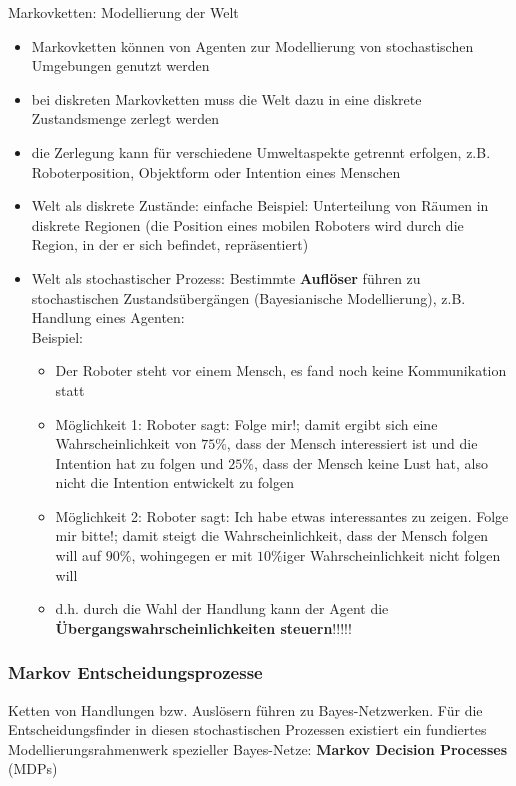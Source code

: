 Markovketten: Modellierung der Welt
\begin{itemize}
	\item Markovketten k\"onnen von Agenten zur Modellierung von stochastischen Umgebungen genutzt werden
	\item bei diskreten Markovketten muss die Welt dazu in eine diskrete Zustandsmenge zerlegt werden
	\item die Zerlegung kann f\"ur verschiedene Umweltaspekte getrennt erfolgen, z.B. Roboterposition, Objektform oder Intention eines Menschen
	\item Welt als diskrete Zust\"ande: einfache Beispiel: Unterteilung von R\"aumen in diskrete Regionen (die Position eines mobilen Roboters wird durch die Region, in der er sich befindet, repr\"asentiert)
	\item Welt als stochastischer Prozess: Bestimmte \textbf{Aufl\"oser} f\"uhren zu stochastischen Zustands\"uberg\"angen (Bayesianische Modellierung), z.B. Handlung eines Agenten:\\ Beispiel:
	\begin{itemize}
		\item Der Roboter steht vor einem Mensch, es fand noch keine Kommunikation statt
		\item M\"oglichkeit 1: Roboter sagt: Folge mir!; damit ergibt sich eine Wahrscheinlichkeit von $75\%$, dass der Mensch interessiert ist und die Intention hat zu folgen und $25\%$, dass der Mensch keine Lust hat, also nicht die Intention entwickelt zu folgen
		\item M\"oglichkeit 2: Roboter sagt: Ich habe etwas interessantes zu zeigen. Folge mir bitte!; damit steigt die Wahrscheinlichkeit, dass der Mensch folgen will auf $90\%$, wohingegen er mit $10\%$iger Wahrscheinlichkeit nicht folgen will
		\item d.h. durch die Wahl der Handlung kann der Agent die \textbf{\"Ubergangswahrscheinlichkeiten steuern}!!!!!
	\end{itemize}
\end{itemize}

\subsubsection{Markov Entscheidungsprozesse}
Ketten von Handlungen bzw. Ausl\"osern f\"uhren zu Bayes-Netzwerken. F\"ur die Entscheidungsfinder in diesen stochastischen Prozessen existiert ein fundiertes Modellierungsrahmenwerk spezieller Bayes-Netze: \textbf{Markov Decision Processes} (MDPs)


